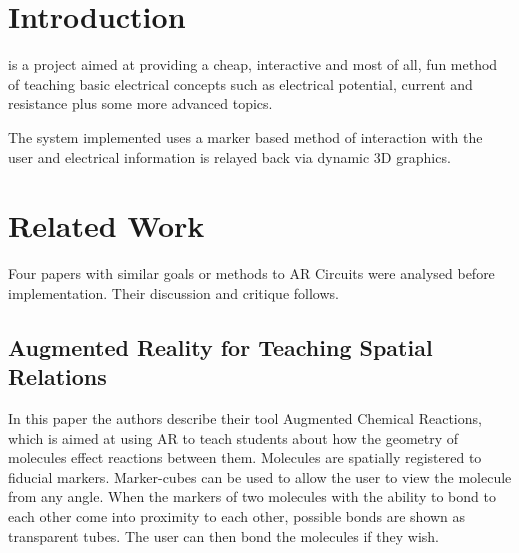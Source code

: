 \maketitle
\IEEEdisplaynotcompsoctitleabstractindextext
\IEEEpeerreviewmaketitle
\section{Introduction}

 is a project aimed at providing a cheap,
interactive and most of all, fun method of teaching basic electrical concepts
such as electrical potential, current and resistance plus some more advanced
topics.

The system implemented uses a marker based method of interaction with the user
and electrical information is relayed back via dynamic 3D graphics.

\section{Related Work}
Four papers with similar goals or methods to AR Circuits were analysed before
implementation. Their discussion and critique follows.

\subsection{Augmented Reality for Teaching Spatial Relations}
In this paper\cite{Maier09} the authors describe their tool Augmented Chemical Reactions, which is aimed at using AR to teach students about how the geometry of molecules effect reactions between them. Molecules are spatially registered to fiducial markers. Marker-cubes can be used to allow the user to view the molecule from any angle. When the markers of two molecules with the ability to bond to each other come into proximity to each other, possible bonds are shown as transparent tubes. The user can then bond the molecules if they wish.

